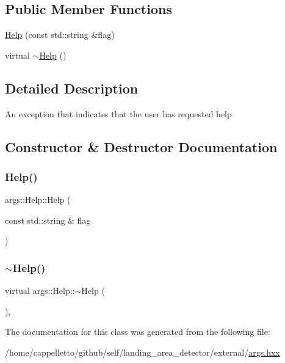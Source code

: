 \subsection*{Public Member Functions}
\begin{DoxyCompactItemize}
\item 
\hyperlink{classargs_1_1_help_a48a25063191a6792bd1582884b940d01}{Help} (const std\+::string \&flag)
\item 
virtual \hyperlink{classargs_1_1_help_abf8f1186f2b1d38cb457e8a589182ec1}{$\sim$\+Help} ()
\end{DoxyCompactItemize}


\subsection{Detailed Description}
An exception that indicates that the user has requested help 

\subsection{Constructor \& Destructor Documentation}
\mbox{\label{classargs_1_1_help_a48a25063191a6792bd1582884b940d01}} 
\subsubsection{\texorpdfstring{Help()}{Help()}}
{\footnotesize\ttfamily args\+::\+Help\+::\+Help (\begin{DoxyParamCaption}\item[{const std\+::string \&}]{flag }\end{DoxyParamCaption})\hspace{0.3cm}{\ttfamily [inline]}}

\mbox{\label{classargs_1_1_help_abf8f1186f2b1d38cb457e8a589182ec1}} 
\subsubsection{\texorpdfstring{$\sim$\+Help()}{~Help()}}
{\footnotesize\ttfamily virtual args\+::\+Help\+::$\sim$\+Help (\begin{DoxyParamCaption}{ }\end{DoxyParamCaption})\hspace{0.3cm}{\ttfamily [inline]}, {\ttfamily [virtual]}}



The documentation for this class was generated from the following file\+:\begin{DoxyCompactItemize}
\item 
/home/cappelletto/github/self/landing\+\_\+area\+\_\+detector/external/\hyperlink{args_8hxx}{args.\+hxx}\end{DoxyCompactItemize}

